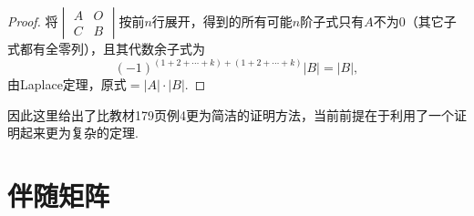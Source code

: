 \begin{proof}
    将$\begin{vmatrix}
            A & O \\
            C & B
        \end{vmatrix}$按前$n$行展开，得到的所有可能$n$阶子式只有$A$不为0（其它子式都有全零列），且其代数余子式为
    \[(-1)^{(1+2+\cdots+k)+(1+2+\cdots+k)}|B|=|B|,\]
    由Laplace定理，原式$=|A|\cdot|B|$.
\end{proof}

因此这里给出了比教材179页例4更为简洁的证明方法，当前前提在于利用了一个证明起来更为复杂的定理.

\section{伴随矩阵}

